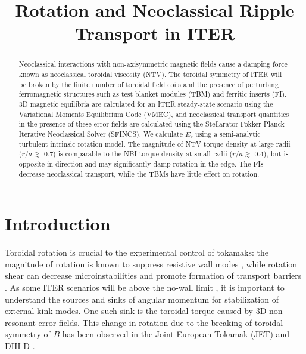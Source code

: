 \documentclass{article}
\title{Rotation and Neoclassical Ripple Transport in ITER}
\begin{document}
\maketitle

\begin{abstract}

Neoclassical interactions with non-axisymmetric magnetic fields cause a damping force known as neoclassical toroidal viscosity (NTV). The toroidal symmetry of ITER will be broken by the finite number of toroidal field coils and the presence of perturbing ferromagnetic structures such as test blanket modules (TBM) and ferritic inserts (FI). 3D magnetic equilibria are calculated for an ITER steady-state scenario using the Variational Moments Equilibrium Code (VMEC), and neoclassical transport quantities in the presence of these error fields are calculated using the Stellarator Fokker-Planck Iterative Neoclassical Solver (SFINCS). We calculate $E_r$ using a semi-analytic turbulent intrinsic rotation model. The magnitude of NTV torque density at large radii ($r/a \gtrsim$ 0.7) is comparable to the NBI torque density at small radii ($r/a \gtrsim$ 0.4), but is opposite in direction and may significantly damp rotation in the edge. The FIs decrease neoclassical transport, while the TBMs have little effect on rotation. 
\end{abstract}

\section{Introduction}

Toroidal rotation is crucial to the experimental control of tokamaks: the magnitude of rotation is known to suppress resistive wall modes \cite{Bondeson1994, Garofalo2002}, while rotation shear can decrease microinstabilities and promote formation of transport barriers \cite{Burrell1997, Terry2000}. As some ITER scenarios will be above the no-wall limit \cite{Liu2004}, it is important to understand the sources and sinks of angular momentum for stabilization of external kink modes. One such sink is the toroidal torque caused by 3D non-resonant error fields. This change in rotation due to the breaking of toroidal symmetry of $B$ has been observed in the Joint European Tokamak (JET) \cite{Lazzaro2002, DeVries2008} and DIII-D \cite{Garofalo2008}. 
\end{document}
